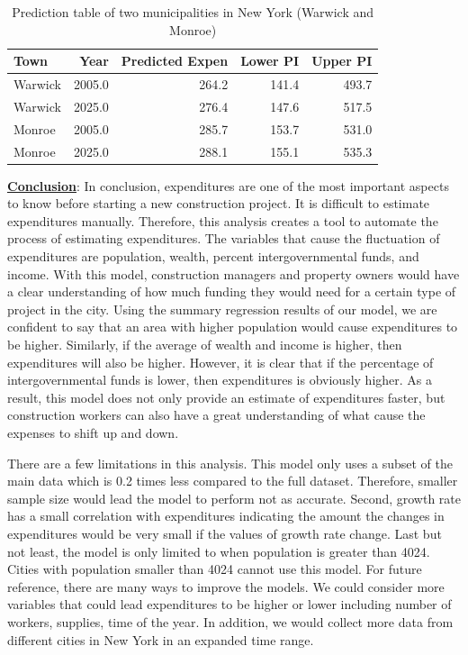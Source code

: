 \documentclass[11pt]{article}\usepackage[]{graphicx}\usepackage[]{color}
\begin{document}
\begin{center}
\begin{table}[ht]
\centering
\begin{tabular}{lrrrr}
  \hline
Town & Year & Predicted Expen & Lower PI & Upper PI \\ 
  \hline
Warwick & 2005.0 & 264.2 & 141.4 & 493.7 \\ 
  Warwick & 2025.0 & 276.4 & 147.6 & 517.5 \\ 
  Monroe & 2005.0 & 285.7 & 153.7 & 531.0 \\ 
  Monroe & 2025.0 & 288.1 & 155.1 & 535.3 \\ 
   \hline
\end{tabular}
\caption{Prediction table of two municipalities in New York (Warwick and Monroe)} 
\label{pred_tab}
\end{table}

\end{center}

\noindent\textbf{\underline{Conclusion}}: In conclusion, expenditures are one of the most important aspects to know before starting a new construction project. It is difficult to estimate expenditures manually. Therefore, this analysis creates a tool to automate the process of estimating expenditures. The variables that cause the fluctuation of expenditures are population, wealth, percent intergovernmental funds, and income. With this model, construction managers and property owners would have a clear understanding of how much funding they would need for a certain type of project in the city. Using the summary regression results of our model, we are confident to say that an area with higher population would cause expenditures to be higher. Similarly, if the average of wealth and income is higher, then expenditures will also be higher. However, it is clear that if the percentage of intergovernmental funds is lower, then expenditures is obviously higher. As a result, this model does not only provide an estimate of expenditures faster, but construction workers can also have a great understanding of what cause the expenses to shift up and down.
\hfill \break

\noindent There are a few limitations in this analysis. This model only uses a subset of the main data which is 0.2 times less compared to the full dataset. Therefore, smaller sample size would lead the model to perform not as accurate. Second, growth rate has a small correlation with expenditures indicating the amount the changes in expenditures would be very small if the values of growth rate change. Last but not least, the model is only limited to when population is greater than 4024. Cities with population smaller than 4024 cannot use this model. For future reference, there are many ways to improve the models. We could consider more variables that could lead expenditures to be higher or lower including number of workers, supplies, time of the year. In addition, we would collect more data from different cities in New York in an expanded time range.    
\hfill \break
\end{document}
